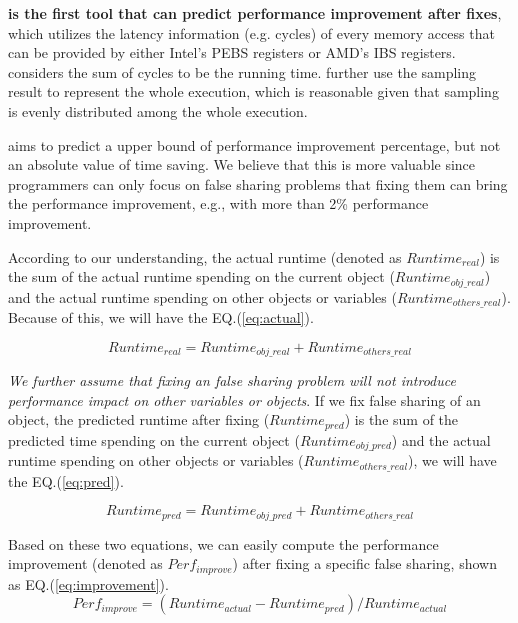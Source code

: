 {\bf \Cheetah{} is the first tool that can predict performance improvement after fixes}, which utilizes the latency information (e.g. cycles) of every memory access that can be provided by either Intel's PEBS registers or AMD's IBS registers. \Cheetah{} considers the sum of cycles to be the running time. \Cheetah{} further use the sampling result to represent the whole execution, which is reasonable given that sampling is evenly distributed among the whole execution. 

\Cheetah{} aims to predict a upper bound of performance improvement percentage, but not an absolute value of time saving. We believe that this is more valuable since programmers can only focus on false sharing problems that fixing them can bring the performance improvement, e.g., with more than 2\% performance improvement.   

According to our understanding, the actual runtime (denoted as $Runtime_{real}$) is the sum of the actual runtime spending on the current object ($Runtime_{obj\_real}$) and the actual runtime spending on other objects or variables ($Runtime_{others\_real}$). Because of this, we will have the EQ.(\ref{eq:actual}). 

\begin{equation}
\label{eq:actual}
Runtime_{real}=Runtime_{obj\_real} + Runtime_{others\_real}
\end{equation} 

{\it We further assume that fixing an false sharing problem will not introduce performance impact on other variables or objects}. If we fix false sharing of an object, the predicted runtime after fixing ($Runtime_{pred}$) is the sum of the predicted time spending on the current object ($Runtime_{obj\_pred}$) and the actual runtime spending on other objects or variables ($Runtime_{others\_real}$), we will have the EQ.(\ref{eq:pred}). 

\begin{equation}
\label{eq:pred}
Runtime_{pred}=Runtime_{obj\_pred}+Runtime_{others\_real}
\end{equation} 

Based on these two equations, we can easily compute the performance improvement (denoted as $Perf_{improve}$) after fixing a specific false sharing, shown as EQ.(\ref{eq:improvement}). 
\begin{equation}
\label{eq:improvement}
Perf_{improve}=(Runtime_{actual} - Runtime_{pred})/Runtime_{actual}
\end{equation} 

